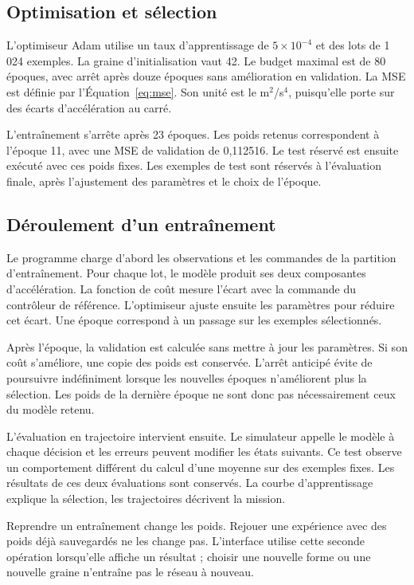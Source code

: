 \subsection{Optimisation et sélection}
L'optimiseur Adam utilise un taux d'apprentissage de $5\times10^{-4}$ et des lots de 1\,024 exemples. La graine d'initialisation vaut 42. Le budget maximal est de 80 époques, avec arrêt après douze époques sans amélioration en validation. La MSE est définie par l'Équation~\eqref{eq:mse}. Son unité est le m$^2$/s$^4$, puisqu'elle porte sur des écarts d'accélération au carré.

L'entraînement s'arrête après 23 époques. Les poids retenus correspondent à l'époque 11, avec une MSE de validation de 0,112516. Le test réservé est ensuite exécuté avec ces poids fixes. Les exemples de test sont réservés à l'évaluation finale, après l'ajustement des paramètres et le choix de l'époque.


\subsection{Déroulement d'un entraînement}
Le programme charge d'abord les observations et les commandes de la partition d'entraînement. Pour chaque lot, le modèle produit ses deux composantes d'accélération. La fonction de coût mesure l'écart avec la commande du contrôleur de référence. L'optimiseur ajuste ensuite les paramètres pour réduire cet écart. Une époque correspond à un passage sur les exemples sélectionnés.

Après l'époque, la validation est calculée sans mettre à jour les paramètres. Si son coût s'améliore, une copie des poids est conservée. L'arrêt anticipé évite de poursuivre indéfiniment lorsque les nouvelles époques n'améliorent plus la sélection. Les poids de la dernière époque ne sont donc pas nécessairement ceux du modèle retenu.

L'évaluation en trajectoire intervient ensuite. Le simulateur appelle le modèle à chaque décision et les erreurs peuvent modifier les états suivants. Ce test observe un comportement différent du calcul d'une moyenne sur des exemples fixes. Les résultats de ces deux évaluations sont conservés. La courbe d'apprentissage explique la sélection, les trajectoires décrivent la mission.

Reprendre un entraînement change les poids. Rejouer une expérience avec des poids déjà sauvegardés ne les change pas. L'interface utilise cette seconde opération lorsqu'elle affiche un résultat ; choisir une nouvelle forme ou une nouvelle graine n'entraîne pas le réseau à nouveau.

